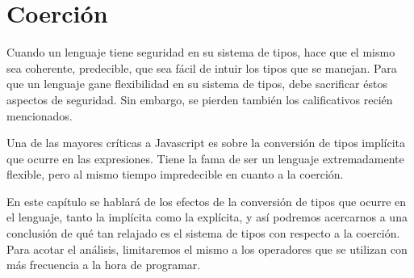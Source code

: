 \chapter{Coerción} %

\label{ch:coercion} %

Cuando un lenguaje tiene seguridad en su sistema de tipos, hace que el mismo sea coherente, predecible, que sea fácil de intuir los tipos que se manejan. Para que un lenguaje gane flexibilidad en su sistema de tipos, debe sacrificar éstos aspectos de seguridad. Sin embargo, se pierden también los calificativos recién mencionados.

Una de las mayores críticas a Javascript es sobre la conversión de tipos implícita que ocurre en las expresiones. Tiene la fama de ser un lenguaje extremadamente flexible, pero al mismo tiempo impredecible en cuanto a la coerción. 

En este capítulo se hablará de los efectos de la conversión de tipos que ocurre en el lenguaje, tanto la implícita como la explícita, y así podremos acercarnos a una conclusión de qué tan relajado es el sistema de tipos con respecto a la coerción. Para acotar el análisis, limitaremos el mismo a los operadores que se utilizan con más frecuencia a la hora de programar.






